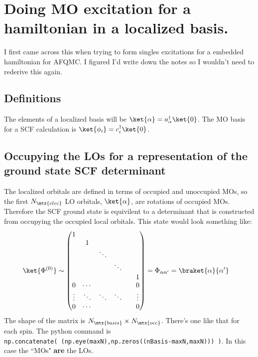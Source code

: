 \documentclass[10pt]{article}
\begin{document}
\section{Doing MO excitation for a hamiltonian in a localized basis. }

I first came across this when trying to form singles excitations for a embedded hamiltonian for AFQMC. 
I figured I'd write down the notes so I wouldn't need to rederive this again. 

\subsection{Definitions}

The elements of a localized basis will be $\ket{\alpha} = a^\dag_\alpha \ket{0}$.
The MO basis for a SCF calculation is $\ket{\phi_i} = c_i^\dag \ket{0}$. 

\subsection{Occupying the LOs for a representation of the ground state SCF determinant}

The localized orbitals are defined in terms of occupied and unoccupied MOs, so the first $N_\mtx{elec}$ LO orbitals, $\ket{\alpha}$, are rotations of occupied MOs.
Therefore the SCF ground state is equivilent to a determinant that is constructed from occupying the occupied local orbitals.
This state would look something like:
\begin{align}
  \ket{\Phi^{(0)}} 
  &\sim
  \begin{pmatrix}
    1 &   &        &  &  &   \\
      & 1 &        &  &  &   \\
      &   & \ddots &  &  &   \\
      &   &  & \ddots  &  &   \\
      &   &        &  &  & 1  \\
    0 & \cdots &  &  &  & 0 \\
    \vdots & \ddots & \ddots & \ddots & & \vdots \\
    0 & \cdots & & & & 0
  \end{pmatrix}
  =
  \Phi_{\alpha \alpha'}
  = 
  \braket{\alpha}{\alpha'}
\end{align}
The shape of the matrix is $N_\mtx{basis} \times N_\mtx{occ}$.
There's one like that for each spin.
The python command is \\\verb|np.concatenate( (np.eye(maxN),np.zeros((nBasis-maxN,maxN))) )|.
In this case the ``MOs" \textbf{are} the LOs.
\end{document}
